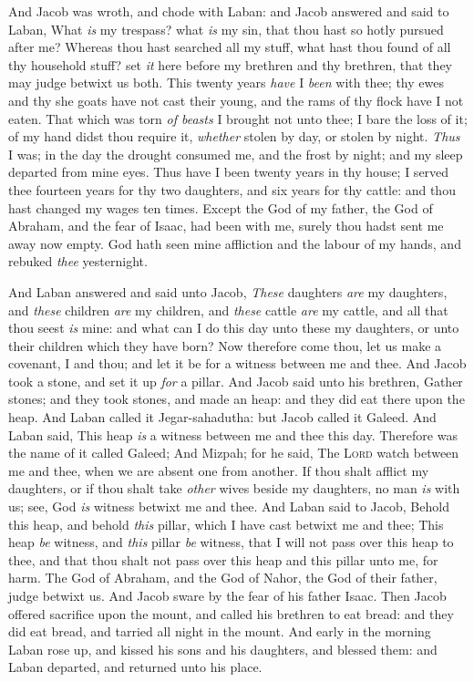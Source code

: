 \documentclass[11pt,letterpaper,oneside]{memoir}
\begin{document}
And Jacob was wroth, and chode with Laban: and Jacob answered and said
to Laban, What \emph{is} my trespass? what \emph{is} my sin, that thou
hast so hotly pursued after me? Whereas thou hast searched all my stuff,
what hast thou found of all thy household stuff? set \emph{it} here
before my brethren and thy brethren, that they may judge betwixt us
both. This twenty years \emph{have} I \emph{been} with thee; thy ewes
and thy she goats have not cast their young, and the rams of thy flock
have I not eaten. That which was torn \emph{of beasts} I brought not
unto thee; I bare the loss of it; of my hand didst thou require it,
\emph{whether} stolen by day, or stolen by night. \emph{Thus} I was; in
the day the drought consumed me, and the frost by night; and my sleep
departed from mine eyes. Thus have I been twenty years in thy house; I
served thee fourteen years for thy two daughters, and six years for thy
cattle: and thou hast changed my wages ten times. Except the God of my
father, the God of Abraham, and the fear of Isaac, had been with me,
surely thou hadst sent me away now empty. God hath seen mine affliction
and the labour of my hands, and rebuked \emph{thee} yesternight.

And Laban answered and said unto Jacob, \emph{These} daughters
\emph{are} my daughters, and \emph{these} children \emph{are} my
children, and \emph{these} cattle \emph{are} my cattle, and all that
thou seest \emph{is} mine: and what can I do this day unto these my
daughters, or unto their children which they have born? Now therefore
come thou, let us make a covenant, I and thou; and let it be for a
witness between me and thee. And Jacob took a stone, and set it up
\emph{for} a pillar. And Jacob said unto his brethren, Gather stones;
and they took stones, and made an heap: and they did eat there upon the
heap. And Laban called it Jegar-sahadutha: but Jacob called it Galeed.
And Laban said, This heap \emph{is} a witness between me and thee this
day. Therefore was the name of it called Galeed; And Mizpah; for he
said, The \textsc{Lord} watch between me and thee, when we are absent one
from another. If thou shalt afflict my daughters, or if thou shalt take
\emph{other} wives beside my daughters, no man \emph{is} with us; see,
God \emph{is} witness betwixt me and thee. And Laban said to Jacob,
Behold this heap, and behold \emph{this} pillar, which I have cast
betwixt me and thee; This heap \emph{be} witness, and \emph{this} pillar
\emph{be} witness, that I will not pass over this heap to thee, and that
thou shalt not pass over this heap and this pillar unto me, for harm.
The God of Abraham, and the God of Nahor, the God of their father, judge
betwixt us. And Jacob sware by the fear of his father Isaac. Then Jacob
offered sacrifice upon the mount, and called his brethren to eat bread:
and they did eat bread, and tarried all night in the mount. And early in
the morning Laban rose up, and kissed his sons and his daughters, and
blessed them: and Laban departed, and returned unto his place.
\end{document}
